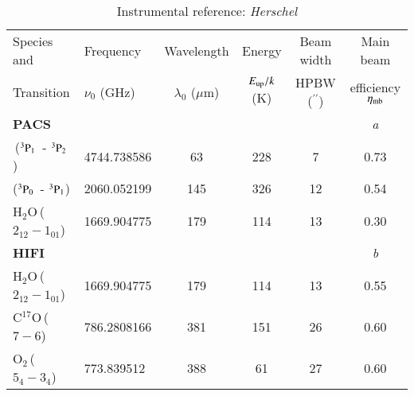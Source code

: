 \documentclass{aa}
\newcommand{\um}{$\mu$m}                                 %
\newcommand{\water}{H$_{2}$O}
\newcommand{\molo}{O$_{2}$}                     %
\newcommand{\pzero}{$^{3}{\rm P}_{0}$}
\newcommand{\pone}{$^{3}{\rm P}_{1}$}
\newcommand{\ptwo}{$^{3}{\rm P}_{2}$}
\newcommand{\asec}{$^{\prime \prime}$}
\begin{document}
\begin{table*}
\caption{Instrumental reference: {\it Herschel}}            
\label{Herschel}      
\begin{tabular}{llcccc}    %
\hline\hline    
\noalign{\smallskip}             
Species and                     & Frequency                             & Wavelength              & Energy                        & Beam width            & Main beam                 \\
Transition                              &  $\nu_0$ (GHz)                        & $\lambda_0$ (\um)& $E_{\rm up}/k$ (K)   & HPBW (\asec)  & efficiency $\eta_{\rm mb}$     \\
\noalign{\smallskip}    
\hline                          
\noalign{\smallskip}    
{\bf PACS}                      &                                               &                               &                               &                               &       \it{a}   \\
\noalign{\smallskip}    
\hline                          
[O\,I]\,(\pone\ - \ptwo)         & 4744.738586                  & \phantom{1}63 &  228                    &\phantom{1}7           & 0.73   \\
\hspace*{7.5mm}(\pzero\ - \pone) &      2060.052199             & 145                   & 326                     & 12                            & 0.54   \\
\water\,($2_{12}-1_{01}$) &1669.904775                          & 179                   & 114                     & 13                            & 0.30   \\
\noalign{\smallskip}
\hline
\noalign{\smallskip} 
{\bf HIFI}                              &                                               &                               &                               &                               &  \it{b}      \\
\noalign{\smallskip}    
\hline                          
\water\,($2_{12}-1_{01}$)       &1669.904775                            & 179                     & 114                   & 13                            & 0.55    \\
C$^{17}$O\,($7-6$)              & \phantom{1}786.2808166        & 381                   & 151                     & 26                            & 0.60  \\
\molo\,($5_4-3_4$)              &  \phantom{1}773.839512        & 388                   &  \phantom{1}61  & 27                            & 0.60  \\

\end{tabular}
\end{table*}
\end{document}
